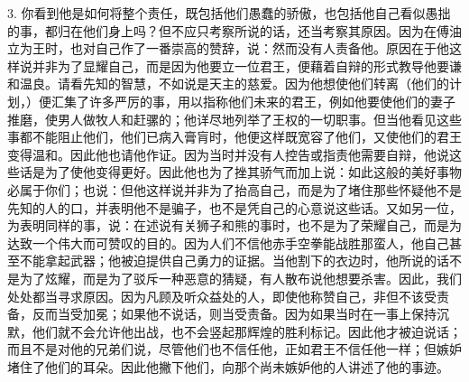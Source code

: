3. 你看到他是如何将整个责任，既包括他们愚蠢的骄傲，也包括他自己看似愚拙的事，都归在他们身上吗？但不应只考察所说的话，还当考察其原因。因为在傅油立为王时，也对自己作了一番崇高的赞辞，说：然而没有人责备他。原因在于他这样说并非为了显耀自己，而是因为他要立一位君王，便藉着自辩的形式教导他要谦和温良。请看先知的智慧，不如说是天主的慈爱。因为他想使他们转离（他们的计划，）便汇集了许多严厉的事，用以指称他们未来的君王，例如他要使他们的妻子推磨，使男人做牧人和赶骡的；他详尽地列举了王权的一切职事。但当他看见这些事都不能阻止他们，他们已病入膏肓时，他便这样既宽容了他们，又使他们的君王变得温和。因此他也请他作证。因为当时并没有人控告或指责他需要自辩，他说这些话是为了使他变得更好。因此他也为了挫其骄气而加上说：如此这般的美好事物必属于你们；也说：但他这样说并非为了抬高自己，而是为了堵住那些怀疑他不是先知的人的口，并表明他不是骗子，也不是凭自己的心意说这些话。又如另一位，为表明同样的事，说：在述说有关狮子和熊的事时，也不是为了荣耀自己，而是为达致一个伟大而可赞叹的目的。因为人们不信他赤手空拳能战胜那蛮人，他自己甚至不能拿起武器；他被迫提供自己勇力的证据。当他割下的衣边时，他所说的话不是为了炫耀，而是为了驳斥一种恶意的猜疑，有人散布说他想要杀害。因此，我们处处都当寻求原因。因为凡顾及听众益处的人，即使他称赞自己，非但不该受责备，反而当受加冕；如果他不说话，则当受责备。因为如果当时在一事上保持沉默，他们就不会允许他出战，也不会竖起那辉煌的胜利标记。因此他才被迫说话；而且不是对他的兄弟们说，尽管他们也不信任他，正如君王不信任他一样；但嫉妒堵住了他们的耳朵。因此他撇下他们，向那个尚未嫉妒他的人讲述了他的事迹。\par

